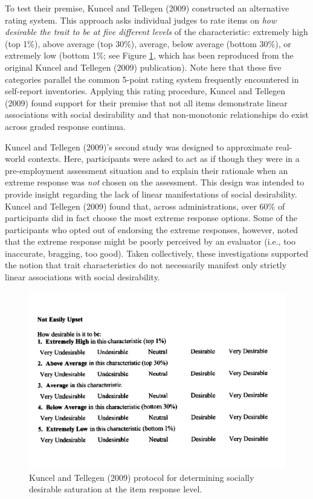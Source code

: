 \documentclass[
  ,jou]{apa6}
\begin{document}
To test their premise, Kuncel and Tellegen (2009) constructed an alternative rating system. This approach asks individual judges to rate items on \emph{how desirable the trait to be at five different levels} of the characteristic: extremely high (top 1\%), above average (top 30\%), average, below average (bottom 30\%), or extremely low (bottom 1\%; see Figure \ref{fig:Figure1}, which has been reproduced from the original Kuncel and Tellegen (2009) publication). Note here that these five categories parallel the common 5-point rating system frequently encountered in self-report inventories. Applying this rating procedure, Kuncel and Tellegen (2009) found support for their premise that not all items demonstrate linear associations with social desirability and that non-monotonic relationships do exist across graded response continua.

Kuncel and Tellegen (2009)'s second study was designed to approximate real-world contexts. Here, participants were asked to act as if though they were in a pre-employment assessment situation and to explain their rationale when an extreme response was \emph{not} chosen on the assessment. This design was intended to provide insight regarding the lack of linear manifestations of social desirability. Kuncel and Tellegen (2009) found that, across administrations, over 60\% of participants did in fact choose the most extreme response options. Some of the participants who opted out of endorsing the extreme responses, however, noted that the extreme response might be poorly perceived by an evaluator (i.e., too inaccurate, bragging, too good). Taken collectively, these investigations supported the notion that trait characteristics do not necessarily manifest only strictly linear associations with social desirability.

\begin{figure}
\centering
\includegraphics{KuncelTellegen_files/figure-latex/Figure1-1.pdf}
\caption{\label{fig:Figure1}Kuncel and Tellegen (2009) protocol for determining socially desirable saturation at the item response level.}
\end{figure}
\end{document}
